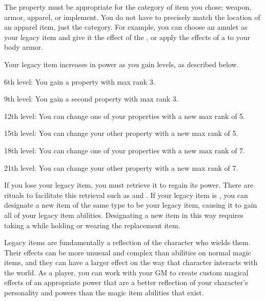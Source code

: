     The property must be appropriate for the category of item you chose: weapon, armor, apparel, or implement.
    You do not have to precisely match the location of an apparel item, just the category.
    For example, you can choose an amulet as your legacy item and give it the effect of the , or apply the effects of a  to your body armor.

    Your legacy item increases in power as you gain levels, as described below.
    \begin{raggeditemize}
      \item 6th level: You gain a property with max rank 3.
      \item 9th level: You gain a second property with max rank 3.
      \item 12th level: You can change one of your properties with a new max rank of 5.
      \item 15th level: You can change your other property with a new max rank of 5.
      \item 18th level: You can change one of your properties with a new max rank of 7.
      \item 21th level: You can change your other property with a new max rank of 7.
    \end{raggeditemize}

    If you lose your legacy item, you must retrieve it to regain its power.
    There are rituals to facilitate this retrieval such as  and .
    If your legacy item is , you can designate a new item of the same type to be your legacy item, causing it to gain all of your legacy item abilities.
    Designating a new item in this way requires taking a  while holding or wearing the replacement item.

    Legacy items are fundamentally a reflection of the character who wields them.
    Their effects can be more unusual and complex than abilities on normal magic items, and they can have a larger effect on the way that character interacts with the world.
    As a player, you can work with your GM to create custom magical effects of an appropriate power that are a better reflection of your character's personality and powers than the magic item abilities that exist.
